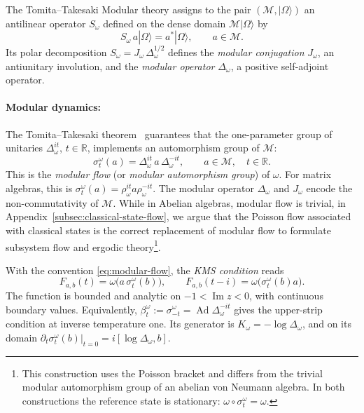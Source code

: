 \documentclass[a4paper,11pt]{article}
\theoremstyle{definition}
\newcommand{\mM}{\mathcal{M}}
\begin{document}
The Tomita--Takesaki Modular theory assigns to the pair $(\mM,|\Omega\rangle)$ an
antilinear operator $S_\omega$ defined on the dense domain
$\mM|\Omega\rangle$ by
\begin{equation}
  S_\omega\, a|\Omega\rangle = a^*|\Omega\rangle, \qquad a\in\mM.
  \label{eq:Tomita-S}
\end{equation}
Its polar decomposition $S_\omega = J_\omega\,\Delta_\omega^{1/2}$ defines the
\emph{modular conjugation} $J_\omega$, an antiunitary involution, and the
\emph{modular operator} $\Delta_\omega$, a positive self-adjoint operator. 

\paragraph{Modular dynamics:}
The Tomita--Takesaki theorem~\cite{Takesaki1970} guarantees that the one-parameter group
of unitaries $\Delta_\omega^{it}$, $t\in\mathbb{R}$, implements an automorphism group of
$\mM$:
\begin{equation}
  \sigma_t^\omega(a) = \Delta_\omega^{it}\, a\, \Delta_\omega^{-it},
  \qquad a\in\mM,\quad t\in\mathbb{R}.
  \label{eq:modular-flow}
\end{equation}
This is the \emph{modular flow} (or \emph{modular automorphism group}) of $\omega$.
For matrix algebras, this is $\sigma^{\omega}_t(a)=\rho_\omega^{it}a\rho_\omega^{-it}$.
The modular operator $\Delta_\omega$ and $J_\omega$ encode the non-commutativity of
$\mM$. While in Abelian algebras, modular flow is trivial, in Appendix~\ref{subsec:classical-state-flow}, we argue that the
Poisson flow associated with classical states is the correct replacement of modular flow to formulate subsystem flow and ergodic theory\footnote{This construction uses
the Poisson bracket and differs from the trivial modular automorphism group of
an abelian von Neumann algebra. In both constructions the reference state is stationary:
$\omega\circ\sigma_t^\omega=\omega$.}.

With the convention \eqref{eq:modular-flow}, the \emph{KMS condition} reads
\begin{equation}
 F_{a,b}(t)=\omega\bigl(a\,\sigma_t^\omega(b)\bigr),
 \qquad F_{a,b}(t-i)=\omega\bigl(\sigma_t^\omega(b)a\bigr).
 \label{eq:KMS-function}
\end{equation}
The function is bounded and analytic on $-1<\operatorname{Im}z<0$, with continuous
boundary values. Equivalently, $\beta_t^\omega:=\sigma_{-t}^\omega
=\operatorname{Ad}\Delta_\omega^{-it}$ gives the upper-strip condition at inverse
temperature one. Its generator is $K_\omega=-\log\Delta_\omega$, and on its domain
$\partial_t\sigma_t^\omega(b)|_{t=0}=i[\log\Delta_\omega,b]$.
\end{document}
